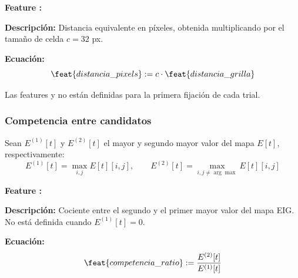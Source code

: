 \begin{featuredef}
\textbf{Feature \thetcbcounter:} 

\textbf{Descripción:} Distancia equivalente en píxeles, obtenida
multiplicando por el tamaño de celda $c = 32$ px.

\textbf{Ecuación:}
\begin{equation}
    \feat{distancia\_pixels} := c \cdot \feat{distancia\_grilla}
\end{equation}
\end{featuredef}

Las features  y 
no están definidas para la primera fijación de cada trial.

\subsubsection{Competencia entre candidatos}

Sean $E^{(1)}[t]$ y $E^{(2)}[t]$ el mayor y segundo mayor valor
del mapa $E[t]$, respectivamente:
\begin{equation}
    E^{(1)}[t] = \max_{i,j} E[t][i,j], \qquad
    E^{(2)}[t] = \max_{i,j \neq \arg\max} E[t][i,j]
\end{equation}



\begin{featuredef}
\textbf{Feature \thetcbcounter:} 

\textbf{Descripción:} Cociente entre el segundo y el primer mayor valor
del mapa EIG. No está definida cuando $E^{(1)}[t] = 0$.

\textbf{Ecuación:}
\begin{equation}
    \feat{competencia\_ratio} := \frac{E^{(2)}[t]}{E^{(1)}[t]}
\end{equation}
\end{featuredef}

